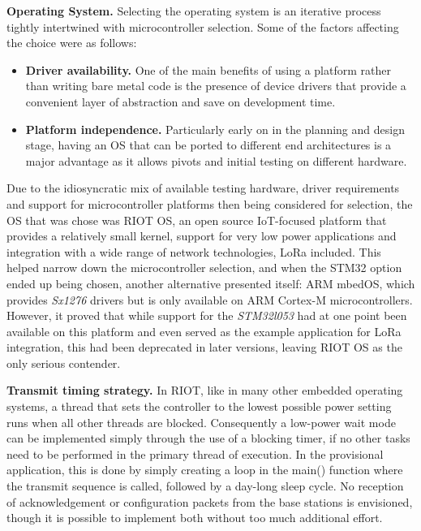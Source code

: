 \documentclass[10pt,nocopyrightspace]{ewsn-proc}
\begin{document}
\textbf{Operating System.}
Selecting the operating system is an iterative process tightly intertwined with microcontroller selection. Some of the factors affecting the choice were as follows:
\begin{itemize}
\item \textbf{Driver availability.} One of the main benefits of using a platform rather than writing bare metal code is the presence of device drivers that provide a convenient layer of abstraction and save on development time.
\item \textbf{Platform independence.} Particularly early on in the planning and design stage, having an OS that can be ported to different end architectures is a major advantage as it allows pivots and initial testing on different hardware.
\end{itemize}
Due to the idiosyncratic mix of available testing hardware, driver requirements and support for microcontroller platforms then being considered for selection, the OS that was chose was RIOT OS, an open source IoT-focused platform that provides a relatively small kernel, support for very low power applications and integration with a wide range of network technologies, LoRa included. This helped narrow down the microcontroller selection, and when the STM32 option ended up being chosen, another alternative presented itself: ARM mbedOS, which provides \textit{Sx1276} drivers but is only available on ARM Cortex-M microcontrollers. However, it proved that while support for the \textit{STM32l053} had at one point been available on this platform and even served as the example application for LoRa integration, this had been deprecated in later versions, leaving RIOT OS as the only serious contender.

\textbf{Transmit timing strategy.}
In RIOT, like in many other embedded operating systems, a thread that sets the controller to the lowest possible power setting runs when all other threads are blocked. Consequently a low-power wait mode can be implemented simply through the use of a blocking timer, if no other tasks need to be performed in the primary thread of execution. In the provisional application, this is done by simply creating a loop in the main() function where the transmit sequence is called, followed by a day-long sleep cycle. No reception of acknowledgement or configuration packets from the base stations is envisioned, though it is possible to implement both without too much additional effort.
\end{document}
